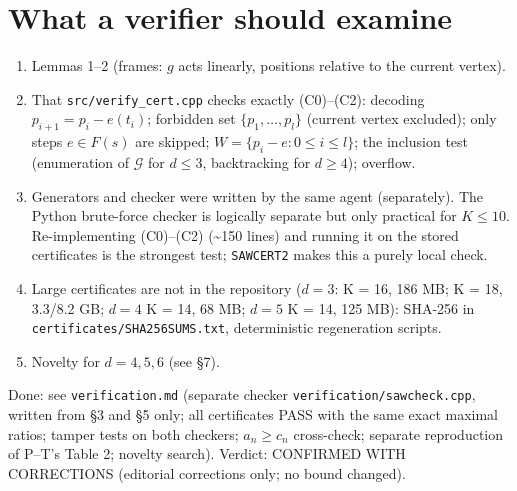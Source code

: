\documentclass[11pt,a4paper]{report}
\begin{document}
\section{What a verifier should examine}

\begin{enumerate}
\def\labelenumi{\arabic{enumi}.}
\tightlist
\item
  Lemmas 1--2 (frames: \(g\) acts linearly, positions relative to the current vertex).
\item
  That \texttt{src/verify\_cert.cpp} checks exactly (C0)--(C2): decoding \(p_{i+1}=p_i-e(t_i)\); forbidden set
  \(\{p_1,\dots,p_l\}\) (current vertex excluded); only steps \(e\in F(s)\) are skipped;
  \(W=\{p_i-e:0\le i\le l\}\); the inclusion test (enumeration of \(\mathcal G\) for \(d\le3\), backtracking for
  \(d\ge4\)); overflow.
\item
  Generators and checker were written by the same agent (separately). The Python brute-force checker is logically
  separate but only practical for \(K\le10\). Re-implementing (C0)--(C2) (\textasciitilde150 lines) and running it on the stored
  certificates is the strongest test; \texttt{SAWCERT2} makes this a purely local check.
\item
  Large certificates are not in the repository (\(d=3\): K = 16, 186 MB; K = 18, 3.3/8.2 GB; \(d=4\) K = 14,
  68 MB; \(d=5\) K = 14, 125 MB): SHA-256 in \texttt{certificates/SHA256SUMS.txt}, deterministic regeneration scripts.
\item
  Novelty for \(d=4,5,6\) (see §7).
\end{enumerate}

Done: see \texttt{verification.md} (separate checker \texttt{verification/sawcheck.cpp}, written from §3 and §5
only; all certificates PASS with the same exact maximal ratios; tamper tests on both checkers; \(a_n\ge c_n\)
cross-check; separate reproduction of P--T's Table 2; novelty search). Verdict: CONFIRMED WITH CORRECTIONS
(editorial corrections only; no bound changed).
\end{document}
